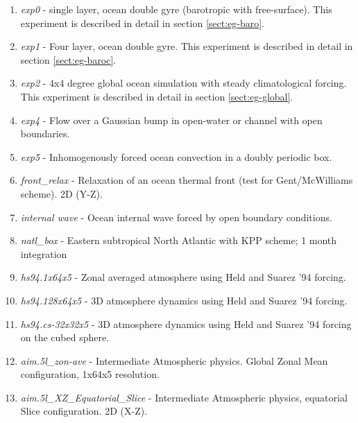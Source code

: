 \begin{enumerate}
\item \textit{exp0} - single layer, ocean double gyre (barotropic with
  free-surface). This experiment is described in detail in section
  \ref{sect:eg-baro}.

\item \textit{exp1} - Four layer, ocean double gyre. This experiment
  is described in detail in section \ref{sect:eg-baroc}.
  
\item \textit{exp2} - 4x4 degree global ocean simulation with steady
  climatological forcing. This experiment is described in detail in
  section \ref{sect:eg-global}.
  
\item \textit{exp4} - Flow over a Gaussian bump in open-water or
  channel with open boundaries.
  
\item \textit{exp5} - Inhomogenously forced ocean convection in a
  doubly periodic box.

\item \textit{front\_relax} - Relaxation of an ocean thermal front (test for
Gent/McWilliams scheme). 2D (Y-Z).

\item \textit{internal wave} - Ocean internal wave forced by open
  boundary conditions.
  
\item \textit{natl\_box} - Eastern subtropical North Atlantic with KPP
  scheme; 1 month integration
  
\item \textit{hs94.1x64x5} - Zonal averaged atmosphere using Held and
  Suarez '94 forcing.
  
\item \textit{hs94.128x64x5} - 3D atmosphere dynamics using Held and
  Suarez '94 forcing.
  
\item \textit{hs94.cs-32x32x5} - 3D atmosphere dynamics using Held and
  Suarez '94 forcing on the cubed sphere.
  
\item \textit{aim.5l\_zon-ave} - Intermediate Atmospheric physics.
  Global Zonal Mean configuration, 1x64x5 resolution.
  
\item \textit{aim.5l\_XZ\_Equatorial\_Slice} - Intermediate
  Atmospheric physics, equatorial Slice configuration.  2D (X-Z).
  

\end{enumerate}
